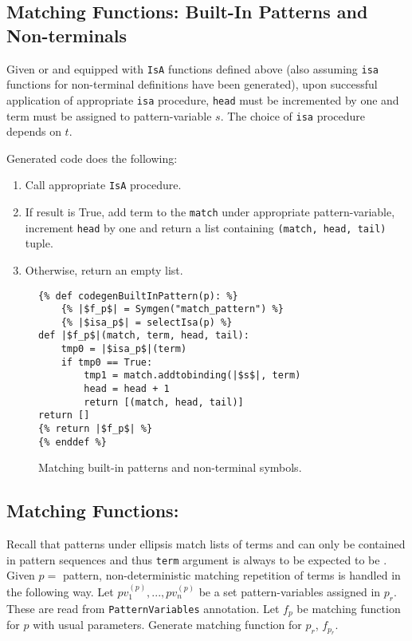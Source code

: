 \subsection{Matching Functions: Built-In Patterns and Non-terminals}
Given \BuiltInPattern \space or \NonTerminal \space and equipped with \texttt{IsA} functions defined above (also assuming \texttt{isa} functions for non-terminal definitions have been generated), upon successful application of appropriate \texttt{isa} procedure, \texttt{head} must be incremented by one and term must be assigned to pattern-variable $s$. The choice of \texttt{isa} procedure depends on $t$.

Generated code does the following:

\begin{enumerate}
\item Call appropriate \texttt{IsA} procedure. 
\item If result is True, add term to the \texttt{match} under appropriate pattern-variable, increment \texttt{head} by one and return a list containing \texttt{(match, head, tail)} tuple.
\item Otherwise, return an empty list.
\end{enumerate}
\begin{figure}[H]
\begin{verbatim}
{% def codegenBuiltInPattern(p): %}
	{% |$f_p$| = Symgen("match_pattern") %}
	{% |$isa_p$| = selectIsa(p) %}
def |$f_p$|(match, term, head, tail):
	tmp0 = |$isa_p$|(term)
	if tmp0 == True:
		tmp1 = match.addtobinding(|$s$|, term) 
		head = head + 1
		return [(match, head, tail)]
return []
{% return |$f_p$| %}
{% enddef %}
\end{verbatim}
\caption{Matching built-in patterns and non-terminal symbols.}
\label{codegen-builtin-nt-1}
\end{figure}

\subsection{Matching Functions: \RepeatNoArg}
\label{section:pattern-repeat}
Recall that patterns under ellipsis match lists of terms and can only be contained in pattern sequences and thus \texttt{term} argument is always to be expected to be \PatternSequence. Given $p=$ \PatternRepeat \space pattern, non-deterministic matching repetition of terms is handled in the following way. Let $pv_1^{(p)}, ..., pv_n^{(p)}$ be a set pattern-variables assigned in $p_r$. These are read from \texttt{PatternVariables} annotation.  Let $f_p$ be matching function for $p$ with usual parameters. Generate  matching function for $p_r$, $f_{p_r}$.

